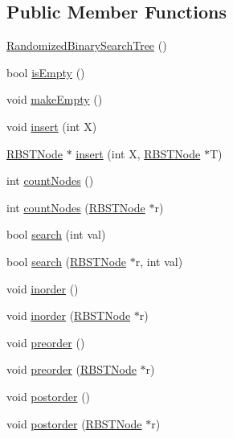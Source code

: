 \subsection*{Public Member Functions}
\begin{DoxyCompactItemize}
\item 
\hyperlink{classRandomizedBinarySearchTree_a3f7c95afaa3f2b411e14cb1d9cf04ff1}{Randomized\+Binary\+Search\+Tree} ()
\item 
bool \hyperlink{classRandomizedBinarySearchTree_af35c367556914452ceba60569e95e5df}{is\+Empty} ()
\item 
void \hyperlink{classRandomizedBinarySearchTree_ae84229d93afdce90f4f0141a04c9736c}{make\+Empty} ()
\item 
void \hyperlink{classRandomizedBinarySearchTree_ae5d6d97456f3d4bca2b0f4b4e184dba3}{insert} (int X)
\item 
\hyperlink{classRBSTNode}{R\+B\+S\+T\+Node} $\ast$ \hyperlink{classRandomizedBinarySearchTree_a0091449480c6b0a5e60ac73875e8ea01}{insert} (int X, \hyperlink{classRBSTNode}{R\+B\+S\+T\+Node} $\ast$T)
\item 
int \hyperlink{classRandomizedBinarySearchTree_a6e7b0de6c0f6816b9785988e34c75dcb}{count\+Nodes} ()
\item 
int \hyperlink{classRandomizedBinarySearchTree_ab50c995c0178f9cb2827840cde6a11f7}{count\+Nodes} (\hyperlink{classRBSTNode}{R\+B\+S\+T\+Node} $\ast$r)
\item 
bool \hyperlink{classRandomizedBinarySearchTree_a3113d572e9cca081f0294fd47a994922}{search} (int val)
\item 
bool \hyperlink{classRandomizedBinarySearchTree_a5d160c8d5176ed873ed3cb83f678983c}{search} (\hyperlink{classRBSTNode}{R\+B\+S\+T\+Node} $\ast$r, int val)
\item 
void \hyperlink{classRandomizedBinarySearchTree_a2581cdb7ec61a153663a44a899f7d9ec}{inorder} ()
\item 
void \hyperlink{classRandomizedBinarySearchTree_a3fad2430835a15aa1b4f564ca066a4c3}{inorder} (\hyperlink{classRBSTNode}{R\+B\+S\+T\+Node} $\ast$r)
\item 
void \hyperlink{classRandomizedBinarySearchTree_a019f49873fd8e266eb41edc0af956b38}{preorder} ()
\item 
void \hyperlink{classRandomizedBinarySearchTree_a6511f06f95a294d00004a8e9fa5c5f29}{preorder} (\hyperlink{classRBSTNode}{R\+B\+S\+T\+Node} $\ast$r)
\item 
void \hyperlink{classRandomizedBinarySearchTree_aad0f82161d579cdb36990bbc72209be5}{postorder} ()
\item 
void \hyperlink{classRandomizedBinarySearchTree_a54f4ac99867ea46280b480c554e42b9b}{postorder} (\hyperlink{classRBSTNode}{R\+B\+S\+T\+Node} $\ast$r)
\end{DoxyCompactItemize}
